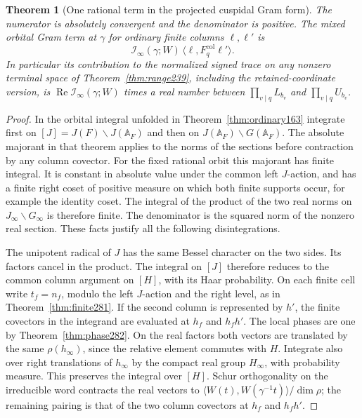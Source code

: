 \documentclass[a4paper,11pt]{article}
\newtheorem{theorem}[proposition]{Theorem}
\theoremstyle{definition}
\theoremstyle{remark}
\numberwithin{equation}{section}
\begin{document}
\begin{theorem}[One rational term in the projected cuspidal Gram form]\leavevmode
\label{thm:real282}
The numerator is absolutely convergent and the denominator
is positive. The mixed orbital Gram term at \(\gamma\) for
ordinary finite columns \(\ell,\ell'\) is
\[
             \mathcal I_\infty(\gamma;W)\,
                    \langle\ell,F_q^{\mathrm{col}}\ell'\rangle .
\]
In particular its contribution to the normalized signed trace
on any nonzero terminal space of Theorem~\ref{thm:range239},
including the retained-coordinate version, is
\(\operatorname{Re}\mathcal I_\infty(\gamma;W)\) times a real
number between \(\prod_{v\mid q} L_{b_v}\) and
\(\prod_{v\mid q} U_{b_v}\).
\end{theorem}
\begin{proof}
In the orbital integral unfolded in Theorem~\ref{thm:ordinary163}
integrate first on \([J]=J(F)\backslash J(\mathbb A_F)\) and
then on \(J(\mathbb A_F)\backslash G(\mathbb A_F)\).
The absolute majorant in that theorem applies to the norms
of the sections before contraction by any column covector.
For the fixed rational orbit this majorant has finite integral.
It is constant in absolute value under the common left
\(J\)-action, and has a finite right coset of positive measure
on which both finite supports occur, for example the identity
coset. The integral of the product of the two real norms on
\(J_\infty\backslash G_\infty\) is therefore finite. The
denominator is the squared norm of the nonzero real section.
These facts justify all the following disintegrations.

The unipotent radical of \(J\) has the same Bessel character on
the two sides. Its factors cancel in the product. The integral
on \([J]\) therefore reduces to the common column argument
on \([H]\), with its Haar probability. On each finite cell
write \(t_f=n_f\), modulo the left \(J\)-action and the
right level, as in Theorem~\ref{thm:finite281}. If the
second column is represented by \(h'\), the finite
covectors in the integrand are evaluated at \(h_f\) and
\(h_f h'\). The local phases are one by
Theorem~\ref{thm:phase282}. On the real factors both vectors
are translated by the same \(\rho(h_\infty)\), since the
relative element commutes with \(H\). Integrate also over
right translations of \(h_\infty\) by the compact real
group \(H_\infty\), with probability measure. This preserves
the integral over \([H]\). Schur orthogonality on the
irreducible word contracts the real vectors to
\(\langle W(t),W(\gamma^{-1}t)\rangle/\dim\rho\);
the remaining pairing is that of the two column covectors
at \(h_f\) and \(h_f h'\).


\end{proof}
\end{document}
